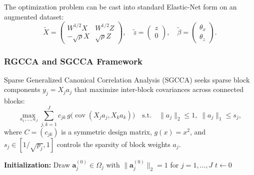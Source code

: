 \documentclass[a4paper,11pt]{paper}
\theoremstyle{plain}
\theoremstyle{definition}
\theoremstyle{remark}
\begin{document}
The optimization problem can be cast into standard Elastic-Net form on an augmented dataset:
$$\tilde{X} = \begin{pmatrix} W^{1/2}X & W^{1/2}Z \\ -\sqrt{\rho}X & \sqrt{\rho}Z \end{pmatrix}, \quad \tilde{z} = \begin{pmatrix} z \\ 0 \end{pmatrix}, \quad \tilde{\beta} = \begin{pmatrix} \theta_x \\ \theta_z \end{pmatrix}.$$

\subsubsection{RGCCA and SGCCA Framework}
\label{sec:sgcca}

Sparse Generalized Canonical Correlation Analysis (SGCCA) \cite{tenenhaus2011rgcca, tenenhaus2014sgcca} seeks sparse block components $y_j = X_j a_j$ that maximize inter-block covariances across connected blocks:
\begin{equation}
    \max_{a_1, \dots, a_J} \sum_{j,k=1}^J c_{jk} \, g\big(\operatorname{cov}(X_j a_j, X_k a_k)\big) \quad \text{s.t.} \quad \|a_j\|_2 \le 1, \; \|a_j\|_1 \le s_j,
    \label{eq:sgcca}
\end{equation}
where $C = (c_{jk})$ is a symmetric design matrix, $g(x) = x^2$, and $s_j \in [1/\sqrt{p_j}, 1]$ controls the sparsity of block weights $a_j$.

\begin{algorithm}[H]
    \caption{Cyclic Block Coordinate Ascent for SGCCA}
    \label{alg:sgcca}

    \textbf{Initialization:} Draw $\mathbf{a}_j^{(0)} \in \Omega_j$ with $\|\mathbf{a}_j^{(0)}\|_2 = 1$ for $j = 1, \dots, J$\;
    $t \leftarrow 0$\;

\end{algorithm}
\end{document}
